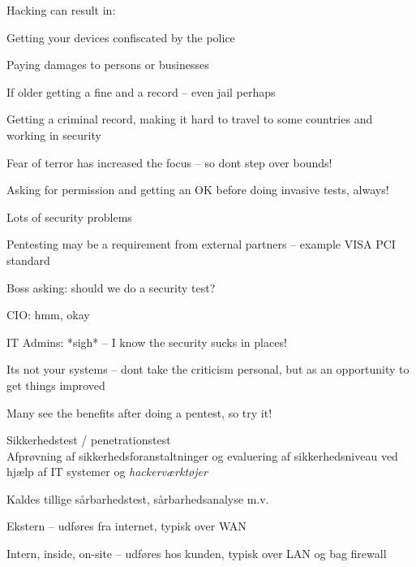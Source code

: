 \documentclass[Screen16to9,17pt]{foils}
\begin{document}
Hacking can result in:
\begin{list2}
\item Getting your devices confiscated by the police
\item Paying damages to persons or businesses
\item If older getting a fine and a record -- even jail perhaps
\item Getting a criminal record, making it hard to travel to some countries and working in security
\item Fear of terror has increased the focus -- so dont step over bounds!
\end{list2}

Asking for permission and getting an OK before doing invasive tests, always!



\begin{list1}
\item Lots of security problems
\item Pentesting may be a requirement from external partners -- example VISA PCI standard
\end{list1}

\begin{list2}
\item Boss asking: should we do a security test?
\item CIO: hmm, okay
\item IT Admins: *sigh* -- I know the security sucks in places!
\item Its not your systems -- dont take the criticism personal, but as an opportunity to get things improved
\end{list2}

\vskip 2cm
\centerline{\Large Many see the benefits after doing a pentest, so try it!}



\begin{list1}
\item Sikkerhedstest / penetrationstest\\
Afprøvning af sikkerhedsforanstaltninger og evaluering af
sikkerhedsniveau ved hjælp af IT systemer og \emph{hackerværktøjer}
\item Kaldes tillige sårbarhedstest, sårbarhedsanalyse m.v.
\item Ekstern -- udføres fra internet, typisk over WAN
\item Intern, inside, on-site -- udføres hos kunden, typisk over LAN og
  bag firewall
\end{list1}
\end{document}
